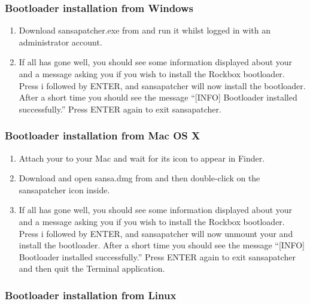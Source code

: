 \subsubsection{Bootloader installation from Windows}

\begin{enumerate}

\item Download sansapatcher.exe from 
and run it whilst logged in with an administrator account.

\item If all has gone well, you should see some information displayed about
your \playertype{} and a message asking you if you wish to install the Rockbox
bootloader. Press i followed by ENTER, and sansapatcher will now
install the bootloader. After a short time you should see the message
``[INFO] Bootloader installed successfully.'' Press ENTER again to exit
sansapatcher.
\end{enumerate}

\subsubsection{Bootloader installation from Mac OS X}

\begin{enumerate}

\item Attach your \dap{} to your Mac and wait for its icon to appear in 
Finder.

\item Download and open sansa.dmg from 
and then double-click on the sansapatcher icon inside. 

\item If all has gone well, you should see some
information displayed about your \dap{} and a message asking you if you 
wish to install the Rockbox bootloader. Press i followed by ENTER, and 
sansapatcher will now unmount your \dap{} and install the bootloader. 
After a short time you should see the message ``[INFO] Bootloader installed successfully.''
Press ENTER again to exit sansapatcher and then quit the Terminal application.
\end{enumerate}

\subsubsection{Bootloader installation from Linux}

